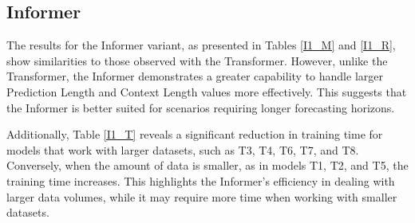 \subsection{Informer}
The results for the Informer variant, as presented in Tables \ref{I1_M} and \ref{I1_R}, show similarities to those observed with the Transformer. However, unlike the Transformer, the Informer demonstrates a greater capability to handle larger Prediction Length and Context Length values more effectively. This suggests that the Informer is better suited for scenarios requiring longer forecasting horizons.

Additionally, Table \ref{I1_T} reveals a significant reduction in training time for models that work with larger datasets, such as T3, T4, T6, T7, and T8. Conversely, when the amount of data is smaller, as in models T1, T2, and T5, the training time increases. This highlights the Informer's efficiency in dealing with larger data volumes, while it may require more time when working with smaller datasets.

